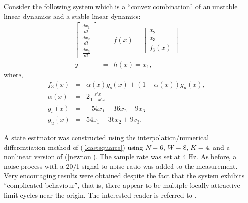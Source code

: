 Consider the following system which is a ``convex combination''
of an unstable linear dynamics and a stable linear dynamics:
\begin{eqnarray}
\left[ \begin{array}{c} \frac{dx_1}{dt} \\ \frac{dx_2}{dt}  
\\ \frac{dx_3}{dt} \end{array} \right] 
& = & f(x) = 
\left[ \begin{array}{c} x_2 \\ x_3 \\ f_3(x)
\end{array} \right]   \label{nonlinmodel} \\
y & = & h(x) = x_1 , \nonumber 
\label{dynamic}
\end{eqnarray}
where,
\begin{eqnarray*}
f_3(x) & = & \alpha(x) g_s(x) + (1 - \alpha(x)) g_u(x), \\
\alpha(x)& =& 2  \frac{x'x}{1 + x'x} \\ 
g_s(x) & = & -54 x_1 - 36 x_2 - 9 x_3 \\
g_u(x) & = & 54 x_1 - 36 x_2 + 9 x_3.
\end{eqnarray*}


A state estimator was constructed using the interpolation/numerical
differentiation method of (\ref{leastsquares}) using $N = 6$,
$W=8$, $K=4$, and a nonlinear version of (\ref{newton}). The sample rate was 
set at
4 Hz. As before, a noise process with a
20/1 signal 
to noise ratio was added to the measurement. Very encouraging results were obtained
despite
the fact that the system exhibits ``complicated behaviour'', that is,
there appear to be multiple locally attractive limit cycles near the origin.
The interested
reader is referred to \cite{UMTechReport93}.

